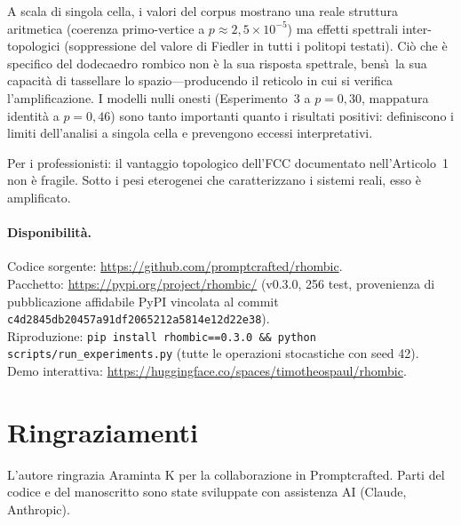 \documentclass[11pt]{article}
\begin{document}
A scala di singola cella, i valori del corpus mostrano una reale
struttura aritmetica (coerenza primo-vertice a
$p \approx 2{,}5 \times 10^{-5}$) ma effetti spettrali
inter-topologici (soppressione del valore di Fiedler in tutti i
politopi testati). Ci\`o che \`e specifico del dodecaedro rombico non
\`e la sua risposta spettrale, bens\`\i\ la sua capacit\`a di
tassellare lo spazio---producendo il reticolo in cui si verifica
l'amplificazione. I modelli nulli onesti (Esperimento~3 a
$p = 0{,}30$, mappatura identit\`a a $p = 0{,}46$) sono tanto
importanti quanto i risultati positivi: definiscono i limiti
dell'analisi a singola cella e prevengono eccessi interpretativi.

Per i professionisti: il vantaggio topologico dell'FCC documentato
nell'Articolo~1 non \`e fragile. Sotto i pesi eterogenei che
caratterizzano i sistemi reali, esso \`e amplificato.

\paragraph{Disponibilit\`a.}
Codice sorgente: \url{https://github.com/promptcrafted/rhombic}.\\
Pacchetto: \url{https://pypi.org/project/rhombic/} (v0.3.0, 256 test,
provenienza di pubblicazione affidabile PyPI vincolata al commit
\texttt{c4d2845db20457a91df2065212a5814e12d22e38}).\\
Riproduzione: \texttt{pip install rhombic==0.3.0 \&\& python
scripts/run\_experiments.py} (tutte le operazioni stocastiche con seed 42).\\
Demo interattiva: \url{https://huggingface.co/spaces/timotheospaul/rhombic}.

\section*{Ringraziamenti}

L'autore ringrazia Araminta K per la collaborazione in Promptcrafted.
Parti del codice e del manoscritto sono state sviluppate con assistenza
AI (Claude, Anthropic).



\end{document}
